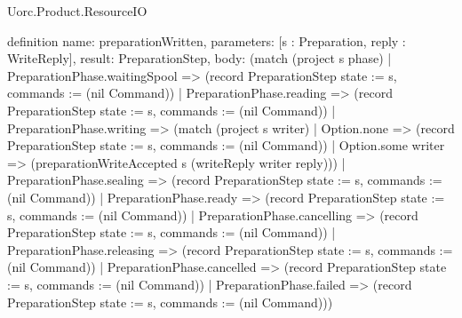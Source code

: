 \begin{lexlean}{Uorc.Product.ResourceIO}
\begin{semanticmodule}
definition{
  name: preparationWritten,
  parameters: [s : Preparation, reply : WriteReply],
  result: PreparationStep,
  body: (match (project s phase)
    | PreparationPhase.waitingSpool => (record PreparationStep {state := s, commands := (nil Command)})
    | PreparationPhase.reading => (record PreparationStep {state := s, commands := (nil Command)})
    | PreparationPhase.writing => (match (project s writer)
      | Option.none => (record PreparationStep {state := s, commands := (nil Command)})
      | Option.some writer => (preparationWriteAccepted s (writeReply writer reply)))
    | PreparationPhase.sealing => (record PreparationStep {state := s, commands := (nil Command)})
    | PreparationPhase.ready => (record PreparationStep {state := s, commands := (nil Command)})
    | PreparationPhase.cancelling => (record PreparationStep {state := s, commands := (nil Command)})
    | PreparationPhase.releasing => (record PreparationStep {state := s, commands := (nil Command)})
    | PreparationPhase.cancelled => (record PreparationStep {state := s, commands := (nil Command)})
    | PreparationPhase.failed => (record PreparationStep {state := s, commands := (nil Command)}))
}


\end{semanticmodule}
\end{lexlean}
